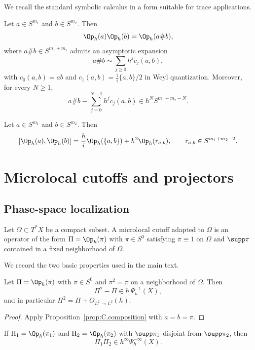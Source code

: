 We recall the standard symbolic calculus in a form suitable for trace applications.

\begin{proposition}
\label{prop:C.composition}
Let $a\in S^{m_1}$ and $b\in S^{m_2}$.
Then
\[
\Op_h(a)\Op_h(b)=\Op_h(a\# b),
\]
where $a\# b\in S^{m_1+m_2}$ admits an asymptotic expansion
\[
a\# b \sim \sum_{j\ge 0} h^j c_j(a,b),
\]
with $c_0(a,b)=ab$ and $c_1(a,b)=\frac{1}{i}\{a,b\}/2$ in Weyl quantization.
Moreover, for every $N\ge 1$,
\[
a\# b - \sum_{j=0}^{N-1} h^j c_j(a,b) \in h^N S^{m_1+m_2-N}.
\]
\end{proposition}

\begin{proposition}
\label{prop:C.commutator}
Let $a\in S^{m_1}$ and $b\in S^{m_2}$.
Then
\[
[\Op_h(a),\Op_h(b)]
=
\frac{h}{i}\Op_h(\{a,b\}) + h^2 \Op_h(r_{a,b}),
\qquad
r_{a,b}\in S^{m_1+m_2-2}.
\]
\end{proposition}

\section{Microlocal cutoffs and projectors}
\label{sec:C.cutoffs}

\subsection{Phase-space localization}
\label{subsec:C.phase-local}

Let $\Omega\subset T^\ast X$ be a compact subset.
A microlocal cutoff adapted to $\Omega$ is an operator of the form $\Pi=\Op_h(\pi)$ with $\pi\in S^0$ satisfying
$\pi\equiv 1$ on $\Omega$ and $\supp \pi$ contained in a fixed neighborhood of $\Omega$.

We record the two basic properties used in the main text.

\begin{lemma}
\label{lem:C.idempotence}
Let $\Pi=\Op_h(\pi)$ with $\pi\in S^0$ and $\pi^2=\pi$ on a neighborhood of $\Omega$.
Then
\[
\Pi^2-\Pi \in h\,\Psi_h^{-1}(X),
\]
and in particular $\Pi^2=\Pi+O_{L^2\to L^2}(h)$.
\end{lemma}

\begin{proof}
Apply Proposition~\ref{prop:C.composition} with $a=b=\pi$.
\end{proof}

\begin{lemma}
\label{lem:C.support}
If $\Pi_1=\Op_h(\pi_1)$ and $\Pi_2=\Op_h(\pi_2)$ with $\supp \pi_1$ disjoint from $\supp \pi_2$, then
\[
\Pi_1\Pi_2 \in h^\infty \Psi_h^{-\infty}(X).
\]
\end{lemma}

